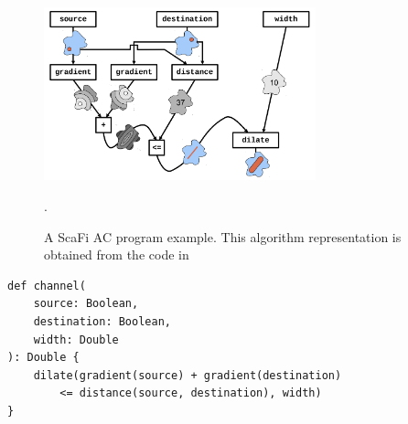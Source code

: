 \documentclass[12pt,a4paper,openright,twoside]{book}
\begin{document}
\begin{figure}[h!]
    \centering
    \includegraphics[width=0.7\textwidth]{figures/channel.png}
    \caption{A ScaFi AC program example. This algorithm representation is obtained from the code in }.
    \label{fig:channel}
\end{figure}

\begin{lstlisting}[caption={A ScaFi AC program example. The algorithm implements a channel between a source and a destination.}, label={lst:channel}]
def channel(
    source: Boolean, 
    destination: Boolean, 
    width: Double
): Double {
    dilate(gradient(source) + gradient(destination) 
        <= distance(source, destination), width)
}
\end{lstlisting}




\end{document}
